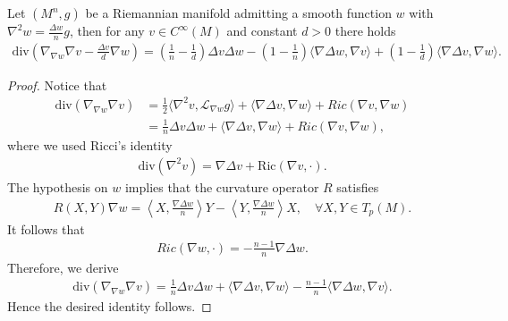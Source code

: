 \documentclass[10pt,a4paper]{amsart}
\begin{document}
\begin{lemma}\label{cor. div 1w}
    Let $(M^n,g)$ be a Riemannian manifold admitting a smooth function $w$ with $\nabla ^2 w=\frac{\Delta w}{n}g$, then for any $v\in C^{\infty}(M)$ and constant $d>0$ there holds
    \begin{align}\label{eq. div 1w}
        \mathrm{div}\left(\nabla_{\nabla w}\nabla v-\frac{\Delta v}{d}\nabla w\right)
        =\left(\frac{1}{n}-\frac{1}{d}\right)\Delta v\Delta w
        -\left(1-\frac{1}{n}\right)\langle\nabla \Delta w,\nabla v\rangle
        +\left(1-\frac{1}{d}\right)\langle\nabla \Delta v,\nabla w\rangle.
    \end{align}
\end{lemma}

\begin{proof}
    Notice that
    \begin{align*}
        \mathrm{div}(\nabla_{\nabla w}\nabla v)
        &=\frac{1}{2}\langle \nabla^2 v,\mathcal{L}_{\nabla w}g\rangle
        +\langle\nabla\Delta v,\nabla w\rangle
        +Ric(\nabla v,\nabla w)\\
        &=\frac{1}{n}\Delta v\Delta w
        +\langle\nabla\Delta v,\nabla w\rangle
        +Ric(\nabla v,\nabla w),
    \end{align*}
    where we used Ricci's identity
    \begin{align*}
        \mathrm{div}(\nabla^2 v)=\nabla \Delta v+\mathrm{Ric}(\nabla v,\cdot).
    \end{align*}
    The hypothesis on $w$ implies that the curvature operator $R$ satisfies
    \begin{align*}
        R(X,Y)\nabla w=\left\langle X, \frac{\nabla \Delta w}{n}\right\rangle Y
        -\left\langle Y, \frac{\nabla \Delta w}{n}\right\rangle X,\quad \forall X,Y\in T_p(M).
    \end{align*}
    It follows that 
    \begin{align*}
        Ric(\nabla w,\cdot)=-\frac{n-1}{n}\nabla \Delta w.
    \end{align*}
    Therefore, we derive
    \begin{align*}
        \mathrm{div}(\nabla_{\nabla w}\nabla v)
        =\frac{1}{n}\Delta v\Delta w
        +\langle\nabla\Delta v,\nabla w\rangle
        -\frac{n-1}{n}\langle\nabla \Delta w,\nabla v\rangle.
    \end{align*}
    Hence the desired identity follows.
\end{proof}
\end{document}
